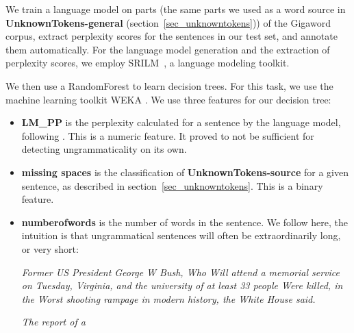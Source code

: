 \documentclass[a4paper,10pt]{scrartcl}
\theoremstyle{style}
\begin{document}
We train a language model on parts (the same parts we used as a word source in \textbf{UnknownTokens-general} (section~\ref{sec_unknowntokens})) of the Gigaword corpus\citep{gigaword}, extract perplexity scores for the sentences in our test set, and annotate them automatically. For the language model generation and the extraction of perplexity scores, we employ SRILM~\citep{stolcke2002srilm}, a language modeling toolkit.


We then use a RandomForest \citep{breiman2001random} to learn decision trees. For this task, we use the machine learning toolkit WEKA \citep{hall2009weka}.
We use three features for our decision tree:

\begin{itemize}
	\item \textbf{LM\_PP} is the perplexity calculated for a sentence by the language model, following \cite{sun2007detecting}. This is a numeric feature. It proved to not be sufficient for detecting ungrammaticality on its own.
	\item \textbf{missing spaces} is the classification of \textbf{UnknownTokens-source} for a given sentence, as described in section~\ref{sec_unknowntokens}. This is a binary feature.
	\item \textbf{numberofwords} is the number of words in the sentence. We follow \cite{wagner2007comparative} here, the intuition is that ungrammatical sentences will often be extraordinarily long, or very short:

		\textit{Former US President George W Bush, Who Will attend a memorial service on Tuesday, Virginia, and the university of at least 33 people Were killed, in the Worst shooting rampage in modern history, the White House said.}

		\textit{The report of a}
\end{itemize}


\end{document}

